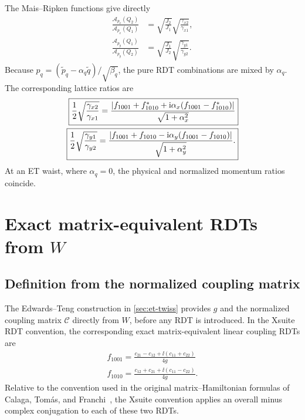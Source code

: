 The Mais--Ripken functions give directly
\begin{align}
 \frac{\mathcal A_{p_x}(Q_2)}{\mathcal A_{p_x}(Q_1)}
 &=\sqrt{\frac{J_2}{J_1}}
   \sqrt{\frac{\gamma_{x2}}{\gamma_{x1}}},\\
 \frac{\mathcal A_{p_y}(Q_1)}{\mathcal A_{p_y}(Q_2)}
 &=\sqrt{\frac{J_1}{J_2}}
   \sqrt{\frac{\gamma_{y1}}{\gamma_{y2}}}.
\end{align}
Because $p_q=(\widetilde p_q-\alpha_q\widetilde q)/\sqrt{\beta_q}$, the pure RDT combinations are mixed by $\alpha_q$.  The corresponding lattice ratios are
\begin{align}
 \boxed{
 \frac12\sqrt{\frac{\gamma_{x2}}{\gamma_{x1}}}
 =\frac{
  \left|f_{1001}+f_{1010}^{*}+\mathrm{i}\alpha_x(f_{1001}-f_{1010}^{*})\right|
 }{\sqrt{1+\alpha_x^2}}
 }
 \label{eq:physical-px-ratio}\\
 \boxed{
 \frac12\sqrt{\frac{\gamma_{y1}}{\gamma_{y2}}}
 =\frac{
  \left|f_{1001}+f_{1010}-\mathrm{i}\alpha_y(f_{1001}-f_{1010})\right|
 }{\sqrt{1+\alpha_y^2}}
 .}
 \label{eq:physical-py-ratio}
\end{align}
At an ET waist, where $\alpha_q=0$, the physical and normalized momentum ratios coincide.

\section{Exact matrix-equivalent RDTs from $W$}
\label{sec:matrix-rdt}

\subsection{Definition from the normalized coupling matrix}

The Edwards--Teng construction in \cref{sec:et-twiss} provides $g$ and the
normalized coupling matrix $\mathcal C$ directly from $W$, before any RDT is
introduced.  In the Xsuite RDT convention, the corresponding exact
matrix-equivalent linear coupling RDTs are
\begin{align}
 \boxed{
 f_{1001}=\frac{
  c_{21}-c_{12}+\ii(c_{11}+c_{22})
 }{4g}
 }
 \label{eq:f1001-from-c}\\
 \boxed{
 f_{1010}=\frac{
  c_{12}+c_{21}+\ii(c_{11}-c_{22})
 }{4g}.
 }
 \label{eq:f1010-from-c}
\end{align}
Relative to the convention used in the original matrix--Hamiltonian formulas of Calaga, Tom\'as, and Franchi~\cite{CalagaTomasFranchi}, the Xsuite convention applies an overall minus complex conjugation to each of these two RDTs.


